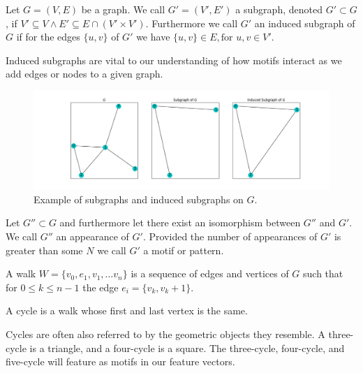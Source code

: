 \begin{dfn}
    Let $G=(V,E)$ be a graph. We call $G'=(V',E')$ a subgraph, denoted $G' \subset G$, if
     $V' \subseteq V \land E' \subseteq E \cap (V' \times V')$. Furthermore we call $G'$
     an induced subgraph of $G$ if for the edges $\{u,v\}$ of $G'$ we have $\{u,v\} \in E, \text{for } u,v \in V'$.
\end{dfn}

\noindent Induced subgraphs are vital to our understanding of how motifs interact as we add edges or nodes
to a given graph.

\begin{figure}[h!]
    \includegraphics[width=16cm]{Images/subgraph.png}
    \centering
    \caption{Example of subgraphs and induced subgraphs on $G$.}
\end{figure}

\begin{dfn}
    Let $G'' \subset G$ and furthermore let there exist an isomorphism between $G''$ and $G'$. We call
    $G''$ an appearance of $G'$. Provided the number of appearances of $G'$ is greater than some $N$ we call $G'$
    a motif or pattern.
\end{dfn}

\begin{dfn}
    A walk $W = \{v_0, e_1, v_1, \dots v_n\}$ is a sequence of edges and vertices of $G$ such that
    for $0 \leq k \leq n-1$ the edge $e_i = \{v_k, v_k+1\}$.
\end{dfn}

\begin{dfn}
    A cycle is a walk whose first and last vertex is the same.
\end{dfn}

Cycles are often also referred to by the geometric objects they resemble. A three-cycle is a triangle, and a four-cycle is a square.
The three-cycle, four-cycle, and five-cycle will feature as motifs in our feature vectors. 

